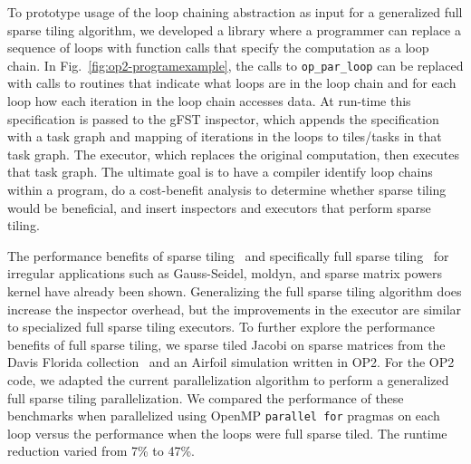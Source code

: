 To prototype usage of the loop chaining abstraction as input for a generalized full 
sparse tiling algorithm, we developed a library
where a programmer can replace
a sequence of loops with function calls that specify the computation 
as a loop chain.  In Fig.~\ref{fig:op2-programexample}, the calls to {\tt op\_par\_loop}
can be replaced with calls to routines that indicate what loops are in the loop chain
and for each loop how each iteration in the loop chain accesses data.
At run-time this specification is passed to the gFST inspector,
which appends the specification with a task graph and mapping of iterations in the loops
to tiles/tasks in that task graph.  The executor, which replaces the original computation,
then executes that task graph.  The ultimate goal is
to have a compiler identify loop chains within a program, do a cost-benefit
analysis to determine whether sparse tiling would be beneficial, and 
insert inspectors and executors that perform sparse tiling.

 



The performance benefits of sparse tiling~\citep{ST-dimeEtna00,ST-Adams99c}
and specifically full sparse tiling~\citep{ST-StroutIJHPCA,ST-StroutPLDI03,ST-commAvoidingSparse2009}
for irregular applications such as Gauss-Seidel, moldyn, and sparse matrix powers kernel
have already been shown.  Generalizing the full sparse tiling algorithm
does increase the inspector overhead, but the improvements in the executor are similar to specialized
full sparse tiling executors.
To further explore the performance benefits of full sparse tiling, we sparse tiled %
Jacobi on sparse matrices from the Davis Florida collection~\citep{ST-Davis2011}
and
an Airfoil simulation written in OP2.
For the OP2 code, we adapted the current parallelization
algorithm to perform a generalized full sparse tiling parallelization.
We  compared the performance of these benchmarks when parallelized using 
OpenMP \texttt{parallel for} pragmas on each loop versus the performance when 
the loops were full sparse tiled.
The runtime reduction varied from 7\% to 47\%.  

